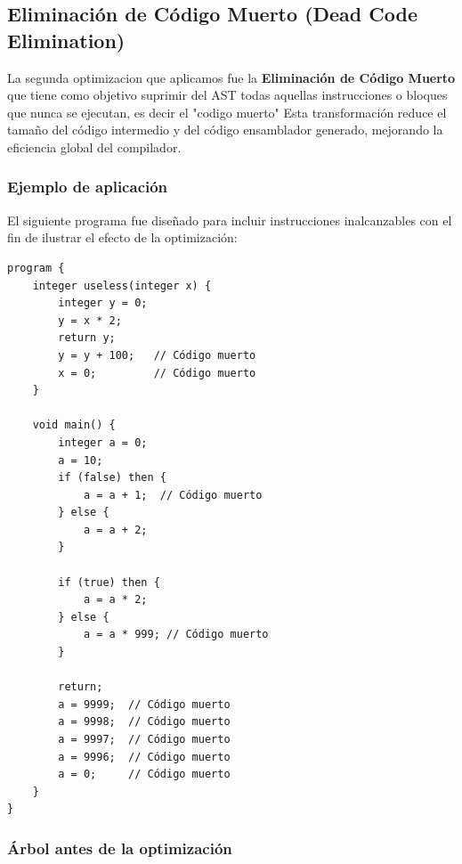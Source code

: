 \documentclass[12pt,a4paper]{article}
\begin{document}
\begin{itemize}
\subsection{Eliminación de Código Muerto (Dead Code Elimination)}

La segunda optimizacion que aplicamos fue la  \textbf{Eliminación de Código Muerto} que tiene como objetivo suprimir del AST todas aquellas instrucciones o bloques que nunca se ejecutan, es decir el "codigo muerto"
Esta transformación reduce el tamaño del código intermedio y del código ensamblador generado, mejorando la eficiencia global del compilador.

\subsubsection*{Ejemplo de aplicación}

El siguiente programa fue diseñado para incluir instrucciones inalcanzables con el fin de ilustrar el efecto de la optimización:

\begin{verbatim}
program {
    integer useless(integer x) {
        integer y = 0;
        y = x * 2;
        return y;
        y = y + 100;   // Código muerto
        x = 0;         // Código muerto
    }

    void main() {
        integer a = 0;
        a = 10;
        if (false) then {
            a = a + 1;  // Código muerto
        } else {
            a = a + 2;
        }

        if (true) then {
            a = a * 2;
        } else {
            a = a * 999; // Código muerto
        }

        return;
        a = 9999;  // Código muerto
        a = 9998;  // Código muerto
        a = 9997;  // Código muerto
        a = 9996;  // Código muerto
        a = 0;     // Código muerto
    }
}
\end{verbatim}

\subsubsection*{Árbol antes de la optimización}


\end{itemize}
\end{document}
